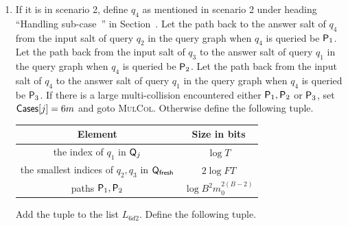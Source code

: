 \begin{enumerate}
\begin{enumerate}
\begin{itemize}
\begin{itemize}
\begin{enumerate}
    Remove the answers corresponding to queries $q_1,q_3$ from $\hrest$ and set $\cs[j]=6d1$.
    \item If it is in scenario 2, define $q_4$ as mentioned in scenario 2 under heading ``Handling sub-case~'' in Section~. Let the path back to the answer salt of $q_4$ from the input salt of query $q_2$ in the query graph when $q_4$ is queried
   be $\mathsf{P}_1$. Let the path back from the input salt of $q_3$ to the answer salt of query $q_1$ in the query graph when $q_4$ is queried be $\mathsf{P}_2$. Let the path back from the input salt of $q_4$ to the answer salt of query $q_1$ in the query graph when $q_4$ is queried be $\mathsf{P}_3$.
    If there is a large multi-collision encountered either $\mathsf{P}_1,\mathsf{P}_2$ or $\mathsf{P}_3$, set $\mathsf{Cases}[j]=6m$ and goto \textsc{MulCol}.
   Otherwise define the following tuple.
   \begin{center}
    \begin{tabular}{|c|c|}\hline

    Element & Size in bits \\ \hline\hline

    the index of $q_1$ in $\mathsf{Q}_j$ & $\log T$\\ \hline

    the smallest indices  of $q_2,q_3$ in $\mathsf{Q}_\textsf{fresh}$ & $2\log FT$   \\\hline
            
    paths $\mathsf{P}_1,\mathsf{P}_2$ & $ \log B^2m_0^{2(B-2)}$\\\hline
    
    \end{tabular}
    \end{center}
   Add the tuple to the list $L_{6d2}$. Define the following tuple.
   \begin{center}
    \begin{tabular}{|c|c|}\hline


\end{tabular}
\end{center}
\end{enumerate}
\end{itemize}
\end{itemize}
\end{enumerate}
\end{enumerate}
